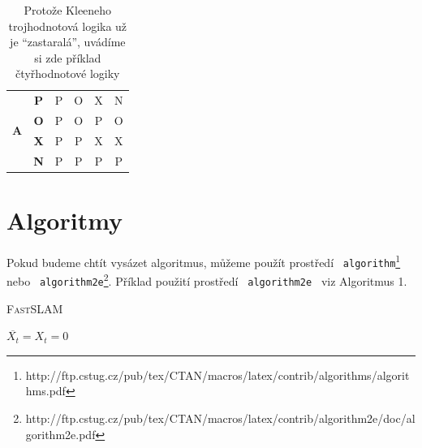 \documentclass[a4paper,11pt]{article}
\begin{document}
\begin{center}
\begin{table}[ht]
\begin{varwidth}[t]{\linewidth}
\begin{tabular}{|c|c|c|c|c|c|}
                    \hline
                    \multirow{4}{*}{\textbf{A}} & \textbf{P} & P & O & X & N \\ 
                    \cline{2-6}
                    & \textbf{O} & P & O & P & O \\ 
                    \cline{2-6}
                    & \textbf{X} & P & P & X & X \\ 
                    \cline{2-6}
                    & \textbf{N} & P & P & P & P \\ 
                    \hline
                \end{tabular}
            \end{varwidth}
            \caption{Protože Kleeneho trojhodnotová logika už je \enquote{zastaralá}, uvádíme si zde příklad čtyřhodnotové logiky}
            \label{tab:quadtabule}
        \end{table}

    \end{center}
    \pagebreak
    \section{Algoritmy}
    Pokud budeme chtít vysázet algoritmus, můžeme použít prostředí \texttt{ algorithm}\footnote{http://ftp.cstug.cz/pub/tex/CTAN/macros/latex/contrib/algorithms/algorithms.pdf} nebo \texttt{ algorithm2e}\footnote{http://ftp.cstug.cz/pub/tex/CTAN/macros/latex/contrib/algorithm2e/doc/algorithm2e.pdf}.
    Příklad použití prostředí \texttt{ algorithm2e } viz Algoritmus 1.
    \IncMargin{1em}
    \begin{algorithm}
        \SetAlgoLined
        \DontPrintSemicolon
        \LinesNumbered
        \SetNlSkip{-0.5em}
        \caption{\textsc{FastSLAM}}
        \label{alg:cap}
        \Indm  
        \Indp
        \BlankLine
        \Indp
        $\overline{X_t} =  X_t = 0$\;
        \SetAlgoNoLine
        \SetAlgoNoLine
    \end{algorithm}
    \DecMargin{1em}
\end{document}
